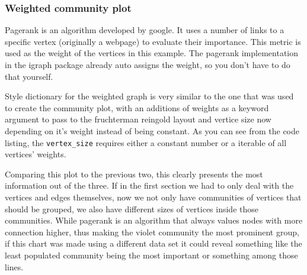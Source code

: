 \documentclass[12pt, a4paper]{article}
\begin{document}
\newpage
\subsubsection{Weighted community plot}

Pagerank  is an algorithm developed by google. It uses a number of links to a specific vertex (originally a webpage) to evaluate their importance. This metric is used as the weight of the vertices in this example. The pagerank implementation in the igraph package already auto assigns the weight, so you don't have to do that yourself.



Style dictionary for the weighted graph is very similar to the one that was used to create the community plot, with an additions of weights as a keyword argument to pass to the fruchterman reingold layout and vertice size now depending on it's weight instead of being constant. As you can see from the code listing, the \texttt{vertex\_size} requires either a constant number or a iterable of all vertices' weights.


%


Comparing this plot to the previous two, this clearly presents the most information out of the three. If in the first section we had to only deal with the vertices and edges themselves, now we not only have communities of vertices that should be grouped, we also have different sizes of vertices inside those communities. While pagerank is an algorithm that always values nodes with more connection higher, thus making the violet community the most prominent group, if this chart was made using a different data set it could reveal something like the least populated community being the most important or something among those lines.
\end{document}

